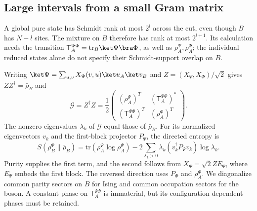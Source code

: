 \documentclass[11pt]{article}
\newcommand{\tr}{\mathrm{tr}}
\begin{document}
\subsection{Large intervals from a small Gram matrix}
\label{app:num-gram}
A global pure state has Schmidt rank at most $2^l$ across
the cut, even though $B$ has $N-l$ sites. The mixture on $B$
therefore has rank at most $2^{l+1}$. Its calculation needs
the transition $\mathsf T_A^{\Psi\Phi}=\tr_B\ket\Psi\bra\Phi$, as well as
$\rho_A^\Psi,\rho_A^\Phi$; the individual reduced states alone do
not specify their Schmidt-support overlap on $B$.

Writing $\ket\Psi=\sum_{u,v}X_{\Psi}(v,u)\ket u_A\ket v_B$ and
$Z=(X_{\Psi},X_{\Phi})/\sqrt2$ gives $ZZ^\dagger=\bar\rho_B$ and
\begin{equation}
 \mathcal G=Z^\dagger Z=\frac12
 \begin{pmatrix}(\rho_A^\Psi)^T&(\mathsf T_A^{\Psi\Phi})^*\\
 (\mathsf T_A^{\Psi\Phi})^T&(\rho_A^\Phi)^T\end{pmatrix}.
 \label{eq:num-gram}
\end{equation}
The nonzero eigenvalues $\lambda_k$ of $\mathcal G$ equal
those of $\bar\rho_B$. For its normalized eigenvectors $v_k$
and the first-block projector $P_{\Psi}$, the directed entropy is
\begin{equation}
 S(\rho_B^\Psi\|\bar\rho_B)=\tr(\rho_A^\Psi\log\rho_A^\Psi)
 -2\sum_{\lambda_k>0}\lambda_k(v_k^\dagger P_{\Psi}v_k)\log\lambda_k.
 \label{eq:num-gram-entropy}
\end{equation}
Purity supplies the first term, and the second follows from
$X_{\Psi}=\sqrt2ZE_{\Psi}$, where $E_{\Psi}$ embeds the first block.
The reversed direction uses $P_{\Phi}$ and $\rho_A^\Phi$.
We diagonalize common parity sectors on $B$ for Ising and
common occupation sectors for the boson. A constant phase on $\mathsf T_A^{\Psi\Phi}$ is immaterial, but its
configuration-dependent phases must be retained.
\end{document}
